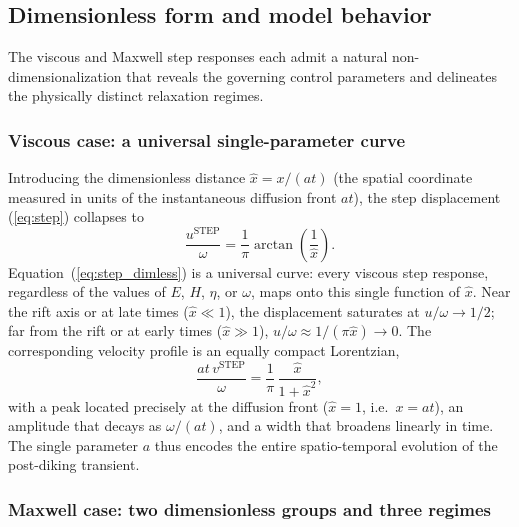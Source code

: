 \documentclass[12pt]{article}
\begin{document}
\subsection{Dimensionless form and model behavior}
\label{sec:dimless}

The viscous and Maxwell step responses each admit a natural non-dimensionalization
that reveals the governing control parameters and delineates the physically
distinct relaxation regimes.

\subsubsection{Viscous case: a universal single-parameter curve}

Introducing the dimensionless distance $\hat{x} = x/(at)$ (the spatial
coordinate measured in units of the instantaneous diffusion front $at$),
the step displacement (\ref{eq:step}) collapses to
\begin{equation}
\frac{u^{\text{STEP}}}{\omega}
= \frac{1}{\pi}\arctan\!\left(\frac{1}{\hat{x}}\right).
\label{eq:step_dimless}
\end{equation}
Equation~(\ref{eq:step_dimless}) is a universal curve: every viscous step
response, regardless of the values of $E$, $H$, $\eta$, or $\omega$, maps
onto this single function of $\hat{x}$.  Near the rift axis or at late times
($\hat{x}\ll 1$), the displacement saturates at $u/\omega\to 1/2$; far from
the rift or at early times ($\hat{x}\gg 1$), $u/\omega\approx
1/(\pi\hat{x})\to 0$.  The corresponding velocity profile is an equally
compact Lorentzian,
\begin{equation}
\frac{at\,v^{\text{STEP}}}{\omega}
= \frac{1}{\pi}\,\frac{\hat{x}}{1+\hat{x}^2},
\label{eq:stepv_dimless}
\end{equation}
with a peak located precisely at the diffusion front ($\hat{x}=1$,
i.e.\ $x = at$), an amplitude that decays as $\omega/(at)$, and a width
that broadens linearly in time.  The single parameter $a$ thus encodes the
entire spatio-temporal evolution of the post-diking transient.

\subsubsection{Maxwell case: two dimensionless groups and three regimes}
\end{document}
